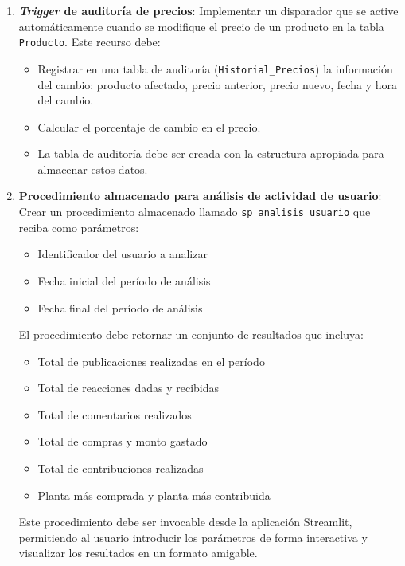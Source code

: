 \documentclass[10pt]{article}
\begin{document}
\begin{enumerate}
\begin{enumerate}
			\item \textbf{\emph{Trigger} de auditoría de precios}: Implementar un disparador que se active automáticamente cuando se modifique el precio de un producto en la tabla \texttt{Producto}. Este recurso debe:
			\begin{itemize}
				\item Registrar en una tabla de auditoría (\texttt{Historial\_Precios}) la información del cambio: producto afectado, precio anterior, precio nuevo, fecha y hora del cambio.
				\item Calcular el porcentaje de cambio en el precio.
				\item La tabla de auditoría debe ser creada con la estructura apropiada para almacenar estos datos.
			\end{itemize}
			
			\item \textbf{Procedimiento almacenado para análisis de actividad de usuario}: Crear un procedimiento almacenado llamado \texttt{sp\_analisis\_usuario} que reciba como parámetros:
			\begin{itemize}
				\item Identificador del usuario a analizar
				\item Fecha inicial del período de análisis
				\item Fecha final del período de análisis
			\end{itemize}
			El procedimiento debe retornar un conjunto de resultados que incluya:
			\begin{itemize}
				\item Total de publicaciones realizadas en el período
				\item Total de reacciones dadas y recibidas
				\item Total de comentarios realizados
				\item Total de compras y monto gastado
				\item Total de contribuciones realizadas
				\item Planta más comprada y planta más contribuida
			\end{itemize}
			Este procedimiento debe ser invocable desde la aplicación Streamlit, permitiendo al usuario introducir los parámetros de forma interactiva y visualizar los resultados en un formato amigable.
			

\end{enumerate}
\end{enumerate}
\end{document}
